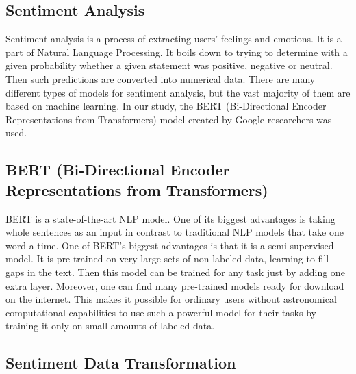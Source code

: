 \documentclass[11pt]{article} %
\begin{document}
\subsection{Sentiment Analysis}
Sentiment analysis is a process of extracting users' feelings and emotions. It is a part of Natural Language Processing. It boils down to trying to determine with a given probability whether a given statement was positive, negative or neutral. Then such predictions are converted into numerical data. There are many different types of models for sentiment analysis, but the vast majority of them are based on machine learning. In our study, the BERT (Bi-Directional Encoder Representations from Transformers) model created by Google researchers was used. 

\subsection{BERT (Bi-Directional Encoder Representations from Transformers)}
BERT is a state-of-the-art NLP model. One of its biggest advantages is taking whole sentences as an input in contrast to traditional NLP models that take one word a time. One of BERT's biggest advantages is that it is a semi-supervised model. It is pre-trained on very large sets of non labeled data, learning to fill gaps in the text. Then this model can be trained for any task just by adding one extra layer. Moreover, one can find many pre-trained models ready for download on the internet. This makes it possible for ordinary users without astronomical computational capabilities to use such a powerful model for their tasks by training it only on small amounts of labeled data. 

\subsection{Sentiment Data Transformation}
\end{document}
